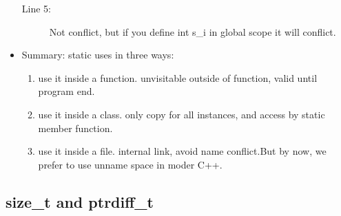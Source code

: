 \documentclass[a4paper,11pt,twoside]{book}
\begin{document}
\begin{itemize}
\begin{description}
	\item[Line 5:] Not conflict, but if you define int s\_i in global scope it will conflict.

\end{description}
	
	\item Summary: static uses in three ways:
	\begin{enumerate}
		\item use it inside a function. unvisitable outside of function, valid until program end.
		
		\item use it inside a class. only copy for all instances, and access by static member function.
		
		\item use it inside a file. internal link, avoid name conflict.But by now, we prefer to use unname space in moder C++.
	\end{enumerate}
\end{itemize}

\subsection{size\_t and ptrdiff\_t}
\end{document}
